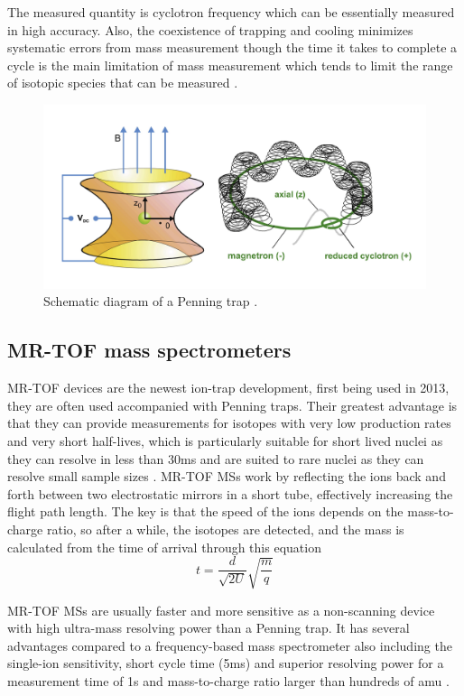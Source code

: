 The measured quantity is cyclotron frequency which can be essentially measured in high accuracy.
Also, the coexistence of trapping and cooling minimizes systematic errors from mass measurement though the time it takes to complete a cycle is the main limitation of mass measurement which tends to limit the range of isotopic species that can be measured \cite{famiano_nuclear_2019}.

\begin{figure}[H]
    \centering
    \includegraphics[width=.5\textwidth]{images/MS_penningtrap.png}
    \caption{Schematic diagram of a Penning trap \cite{famiano_nuclear_2019}.}\label{fig:MS_PT}
\end{figure}

\subsection{MR-TOF mass spectrometers}
MR-TOF devices are the newest ion-trap development, first being used in 2013, they are often used accompanied with Penning traps.
Their greatest advantage is that they can provide measurements for isotopes with very low production rates and very short half-lives, which is particularly suitable for short lived nuclei as they can resolve in less than 30ms and are suited to rare nuclei as they can resolve small sample sizes \cite{noauthor_isoltraps_nodate}.
MR-TOF MSs work by reflecting the ions back and forth between two electrostatic mirrors in a short tube, effectively increasing the flight path length.
The key is that the speed of the ions depends on the mass-to-charge ratio, so after a while, the isotopes are detected, and the mass is calculated from the time of arrival through this equation
\begin{equation}
    t = \frac{d}{\sqrt{2U}}\sqrt{\frac{m}{q}}
\end{equation}

MR-TOF MSs are usually faster and more sensitive as a non-scanning device with high ultra-mass resolving power than a Penning trap.
It has several advantages compared to a frequency-based mass spectrometer also including the single-ion sensitivity, short cycle time (5ms) and superior resolving power for a measurement time of 1s and mass-to-charge ratio larger than hundreds of amu \cite{dickel_multiple-reflection_2013}.
